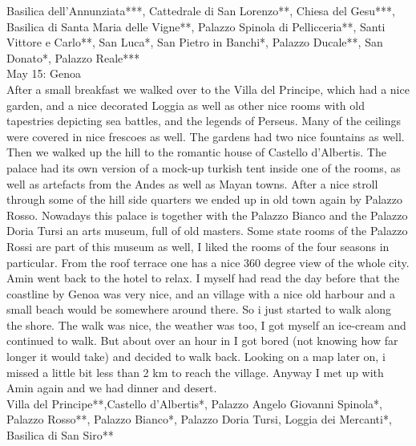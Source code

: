 Basilica dell'Annunziata***, Cattedrale di San Lorenzo**, Chiesa del Gesu***, Basilica di Santa Maria delle Vigne**, Palazzo Spinola di Pellicceria**, Santi Vittore e Carlo**,  San Luca*, San Pietro in Banchi*, Palazzo Ducale**, San Donato*, Palazzo Reale***\\

May 15: Genoa\\
After a small breakfast we walked over to the Villa del Principe, which had a nice garden, and a nice decorated Loggia as well as other nice rooms with old tapestries depicting sea battles, and the legends of Perseus. Many of the ceilings were covered in nice frescoes as well. The gardens had two nice fountains as well. Then we walked up the hill to the romantic house of Castello d'Albertis. The palace had its own version of a mock-up turkish tent inside one of the rooms, as well as artefacts from the Andes as well as Mayan towns. After a nice stroll through some of the hill side quarters we ended up in old town again by Palazzo Rosso. Nowadays this palace is together with the Palazzo Bianco and the Palazzo Doria Tursi an arts museum, full of old masters. Some state rooms of the Palazzo Rossi are part of this museum as well, I liked the rooms of the four seasons in particular. From the roof terrace one has a nice 360 degree view of the whole city. Amin went back to the hotel to relax. I myself had read the day before that the coastline by Genoa was very nice, and an village with a nice old harbour and a small beach would be somewhere around there. So i just started to walk along the shore. The walk was nice, the weather was too, I got myself an ice-cream and continued to walk. But about over an hour in I got bored (not knowing how far longer it would take) and decided to walk back. Looking on a map later on, i missed a little bit less than 2 km to reach the village. Anyway I met up with Amin again and we had dinner and desert.\\

Villa del Principe**,Castello d'Albertis*, Palazzo Angelo Giovanni Spinola*, Palazzo Rosso**, Palazzo Bianco*, Palazzo Doria Tursi, Loggia dei Mercanti*,  Basilica di San Siro**\\

